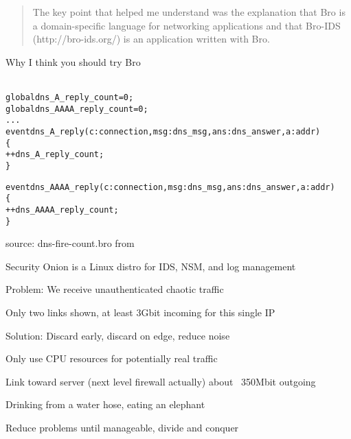 \documentclass[20pt,landscape,a4paper,footrule]{foils}
\begin{document}
\begin{quote}
	The key point that helped me understand was the explanation that Bro is a
               domain-specific language for networking applications and that Bro-IDS
               (http://bro-ids.org/) is an application written with Bro.
\end{quote}

Why I think you should try Bro\\
\\


\begin{alltt}\small
global dns_A_reply_count=0;
global dns_AAAA_reply_count=0;
...
event dns_A_reply(c: connection, msg: dns_msg, ans: dns_answer, a: addr)
	\{
	++dns_A_reply_count;
	\}

event dns_AAAA_reply(c: connection, msg: dns_msg, ans: dns_answer, a: addr)
	\{
	++dns_AAAA_reply_count;
	\}
\end{alltt}

source: dns-fire-count.bro from\\
{\small {}}





\begin{list2}
\item Security Onion is a Linux distro for IDS, NSM, and log management
\item {}
\item {}
\end{list2}




\begin{list1}
\item Problem: We receive unauthenticated chaotic traffic
\item Only two links shown, at least 3Gbit incoming for this single IP
\end{list1}


\begin{list1}
\item Solution: Discard early, discard on edge, reduce noise
\item Only use CPU resources for potentially real traffic
\item Link toward server (next level firewall actually) about ~350Mbit outgoing
\item Drinking from a water hose, eating an elephant
\item Reduce problems until manageable, divide and conquer
\end{list1}
\end{document}

